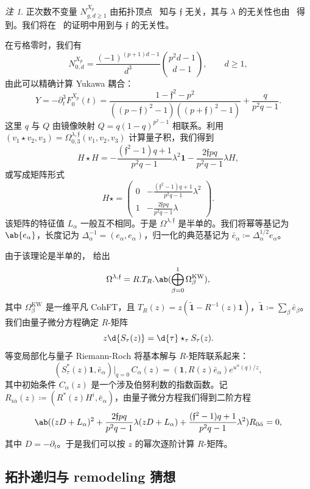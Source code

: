 \documentclass{amsart}
\theoremstyle{definition}
\theoremstyle{remark}
\newtheorem{rmk}[thm]{注}
\theoremstyle{plain}
\theoremstyle{definition}
\theoremstyle{remark}
\newcommand{\mf}[1]{\mathfrak{#1}}
\newcommand{\mr}[1]{\mathrm{#1}}
\newcommand{\wt}[1]{\widetilde{#1}}
\newcommand{\1}{\mathbf{1}}
\newcommand{\2}{\mathbf{2}}
\newcommand{\3}{\mathbf{3}}
\begin{document}
\begin{rmk}
    正次数不变量 \(N^{X_p}_{g,d\geq1}\) 由拓扑顶点~\cite{LLLZ2009} 知与 \(\mf{f}\) 无关，其与 \(\lambda\) 的无关性也由~ 得到。我们将在~ 的证明中用到与 \(\mf{f}\) 的无关性。
\end{rmk}

在亏格零时，我们有
\[ N^{X_p}_{0,d} = \frac{(-1)^{(p+1)d-1}}{d^3}\binom{p^2d-1}{d-1}, \qquad d \geq 1, \]
由此可以精确计算 Yukawa 耦合：
\[ Y = -\partial_t^3 F_0^{X_p}(t) = \frac{1-\mf{f}^2-p^2}{((p-\mf{f})^2-1)((p+\mf{f})^2-1)} + \frac{q}{p^2q-1}. \]
这里 \(q\) 与 \(Q\) 由镜像映射 \(Q = q(1-q)^{p^2-1}\) 相联系。利用 \((v_1 \star v_2, v_3) = \Omega^{\lambda,\mf{f}}_{0,3}(v_1,v_2,v_3)\) 计算量子积，我们得到
\[ H \star H = -\frac{(\mf{f}^2-1)q+1}{p^2q-1}\lambda^2 \1 - \frac{2\mf{f}pq}{p^2q-1}\lambda H, \]
或写成矩阵形式
\[ H \star = \begin{pmatrix} 0 & -\frac{(\mf{f}^2-1)q+1}{p^2q-1}\lambda^2 \\ 1 & -\frac{2\mf{f}pq}{p^2q-1}\lambda \end{pmatrix}. \]
该矩阵的特征值 \(L_{\alpha}\) 一般互不相同。于是 \(\Omega^{\lambda,\mf{f}}\) 是半单的。我们将幂等基记为 \(\ab\{e_{\alpha}\}\)，长度记为 \(\Delta_{\alpha}^{-1} = (e_{\alpha},e_{\alpha})\)，归一化的典范基记为 \(\bar{e}_{\alpha} \coloneqq \Delta_{\alpha}^{1/2}e_{\alpha}\)。

由于该理论是半单的， 给出
\[ \Omega^{\lambda,\mf{f}} = R.T_R.\ab(\bigoplus_{\beta=0}^1 \Omega^{\mr{KW}}_{\beta}), \]
其中 \(\Omega^{\mr{KW}}_{\beta}\) 是一维平凡 CohFT，且 \(T_R(z) = z(\wt{\1}-R^{-1}(z)\1)\)，\(\wt{\1} \coloneqq \sum_{\beta}\bar{e}_{\beta}\)。我们由量子微分方程确定 \(R\)-矩阵
\[ z \d{S_{\tau}(z)} = \d{\tau} \star_{\tau} S_{\tau}(z). \]
等变局部化与量子 Riemann-Roch 将基本解与 \(R\)-矩阵联系起来：
\[ (S^*_{\tau}(z)\1, \bar{e}_{\alpha})\big|_{q=0}\, C_{\alpha}(z) = (\1, R(z)\bar{e}_{\alpha})e^{u^{\alpha}(q)/z}, \]
其中初始条件 \(C_{\alpha}(z)\) 是一个涉及伯努利数的指数函数。记 \(R_{i\bar{\alpha}}(z) \coloneqq (R^*(z)H^i, \bar{e}_{\alpha})\)，由量子微分方程我们得到二阶方程
\[ \ab( (zD+L_{\alpha})^2 + \frac{2\mf{f}pq}{p^2q-1}\lambda(zD+L_{\alpha}) + \frac{(\mf{f}^2-1)q+1}{p^2q-1}\lambda^2 )R_{0\bar{\alpha}} = 0, \]
其中 \(D = -\partial_t\)。于是我们可以按 \(z\) 的幂次逐阶计算 \(R\)-矩阵。

\subsection{拓扑递归与 remodeling 猜想}%
\label{sub:Topological recursion and the remodeling conjecture}
\end{document}
